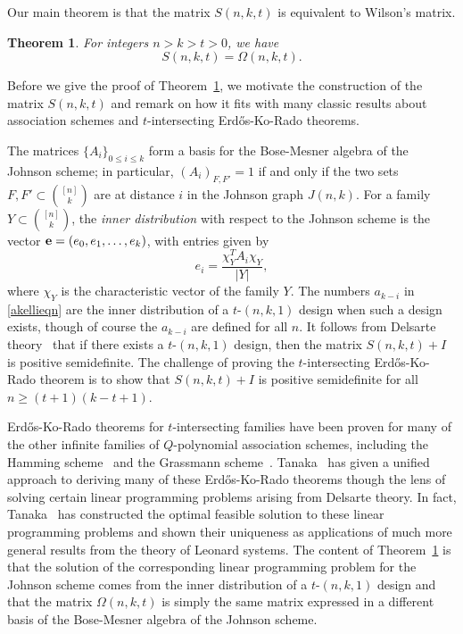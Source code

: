 \documentclass[12pt]{article}
\newtheorem{theorem}{Theorem}
\theoremstyle{definition}
\theoremstyle{remark}
\begin{document}
Our main theorem is that the matrix $S(n, k, t)$ is equivalent to Wilson's matrix. 

\begin{theorem}\label{thm:somegathm}
For integers $n > k > t > 0$, we have 
\[S(n, k, t) = \Omega(n, k, t).\]
\end{theorem}

Before we give the proof of Theorem~\ref{thm:somegathm}, we motivate the construction of the matrix $S(n, k, t)$ and remark on how it fits with many classic results about association schemes and $t$-intersecting Erd\H{o}s-Ko-Rado theorems. 

The matrices $\{A_i\}_{0\le i\le k}$ form a basis for the Bose-Mesner algebra of the Johnson scheme; in particular, $(A_i)_{F, F'} = 1$ if and only if the two sets $F, F'\subset \binom{[n]}{k}$ are at distance $i$ in the Johnson graph $J(n, k)$. For a family $Y \subset \binom{[n]}{k}$, the \emph{inner distribution} with respect to the Johnson scheme is the vector ${\bf e} = (e_0, e_1, \ldots, e_k)$, with entries given by \[e_i = \frac{\chi_Y^TA_i\chi_Y}{|Y|},\]
where $\chi_Y$ is the characteristic vector of the family $Y$. The numbers $a_{k-i}$ in \eqref{akellieqn} are the inner distribution of a $t$-$(n, k, 1)$ design when such a design exists, though of course the $a_{k-i}$ are defined for all $n$. It follows from Delsarte theory~\cite[Theorem 3.3]{Del} that if there exists a $t$-$(n, k, 1)$ design, then the matrix $S(n, k, t) + I$ is positive semidefinite. The challenge of proving the $t$-intersecting Erd\H{o}s-Ko-Rado theorem is to show that $S(n, k, t) + I$ is positive semidefinite for all $n\ge (t+1)(k-t+1)$. 

Erd\H{o}s-Ko-Rado theorems for $t$-intersecting families have been proven for many of the other infinite families of $Q$-polynomial association schemes, including the Hamming scheme~\cite{Moo} and the Grassmann scheme~\cite{FW}. Tanaka~\cite{Tan1, Tan2} has given a unified approach to deriving many of these Erd\H{o}s-Ko-Rado theorems though the lens of solving certain linear programming problems arising from Delsarte theory. In fact, Tanaka~\cite{Tan3} has constructed the optimal feasible solution to these linear programming problems and shown their uniqueness as applications of much more general results from the theory of Leonard systems.  The content of Theorem~\ref{thm:somegathm} is that the solution of the corresponding linear programming problem for the Johnson scheme comes from the inner distribution of a $t$-$(n, k, 1)$ design and that the matrix $\Omega(n, k, t)$ is simply the same matrix expressed in a different basis of the Bose-Mesner algebra of the Johnson scheme. 
\end{document}
